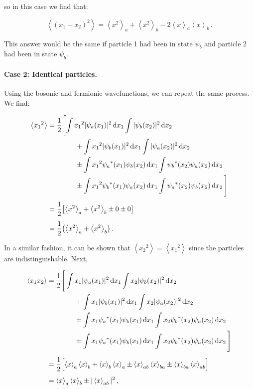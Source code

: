 \documentclass[12pt, titlepage]{article}
\newcommand{\exv}[1]{\left\langle #1 \right\rangle}
\begin{document}
so in this case we find that:

\begin{equation}
		\exv{(x_1-x_2)^2} = \exv{x^2}_a + \exv{x^2}_b - 2\exv{x}_a\exv{x}_b \,.
\end{equation}

This answer would be the same if particle 1 had been in state $\psi_b$ and particle 2 had been in state $\psi_b$.

\paragraph*{Case 2: Identical particles.} Using the bosonic and fermionic wavefunctions, we can repeat the same process. We find:

\begin{align*}
	\exv{{x_1}^2} &= \frac{1}{2}\Biggl[\Biggl. \int{x_1}^2|\psi_a(x_1)|^2\dd{x_1}\int|\psi_b(x_2)|^2\dd{x_2} \\ &\qquad\qquad + \int{x_1}^2|\psi_b(x_1)|^2\dd{x_1}\int|\psi_a(x_2)|^2\dd{x_2} \\
	&\qquad\qquad\pm \int{x_1}^2{\psi_a}^*(x_1)\psi_b(x_2)\dd{x_1}\int{\psi_b}^*(x_2)\psi_a(x_2) \dd{x_2} \\ 
	& \qquad\qquad\pm \int{x_1}^2{\psi_b}^*(x_1)\psi_a(x_2)\dd{x_1}\int{\psi_a}^*(x_2)\psi_b(x_2) \dd{x_2} \Biggl.\Biggr] \\[4pt]
	&= \frac{1}{2}\qty[\exv{x^2}_a + \exv{x^2}_b \pm 0 \pm 0] \\[4pt]
	&= \frac{1}{2}\qty(\exv{x^2}_a + \exv{x^2}_b) \,.
\end{align*}

In a similar fashion, it can be shown that $\exv{{x_2}^2} = \exv{{x_1}^2}$ since the particles are indistinguishable. Next,

\begin{align*}
	\exv{x_1x_2} &= \frac{1}{2}\Biggl[\Biggr. \int x_1|\psi_a(x_1)|^2\dd{x_1}\int x_2|\psi_b(x_2)|^2\dd{x_2} \\
	&\qquad\qquad + \int x_1|\psi_b(x_1)|^2\dd{x_1}\int x_2|\psi_a(x_2)|^2\dd{x_2} \\
	&\qquad\qquad \pm \int x_1{\psi_a}^*(x_1)\psi_b(x_1)\dd{x_1}\int x_2{\psi_b}^*(x_2)\psi_a(x_2)\dd{x_2} \\
	&\qquad\qquad \pm \int x_1{\psi_a}^*(x_1)\psi_b(x_1)\dd{x_1}\int x_2{\psi_b}^*(x_2)\psi_a(x_2)\dd{x_2} \Biggl.\Biggr] \\[4pt]
	&= \frac{1}{2}\Bigl[\exv{x}_a\exv{x}_b + \exv{x}_b\exv{x}_a \pm \exv{x}_{ab}\exv{x}_{ba} \pm \exv{x}_{ba}\exv{x}_{ab}\Bigr] \\[4pt]
	&= \exv{x}_a\exv{x}_b \pm |\exv{x}_{ab}|^2 \,,
\end{align*}
\end{document}
